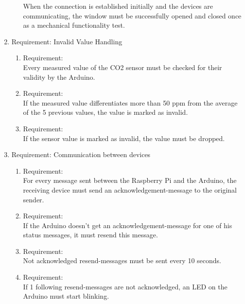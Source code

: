 \begin{enumerate}[label*=\arabic*.]
\begin{enumerate}[label*=\arabic*.]
            When the connection is established initially and the devices are communicating, the window must be successfully opened and closed once as a mechanical functionality test.\\
		\end{enumerate}
		\item \label{req.2}  Requirement:  Invalid Value Handling\\
  	\begin{enumerate}[label*=\arabic*.]
			\item \label{req.2.1}  Requirement:  \\
			Every measured value of the CO2 sensor must be checked for their validity by the Arduino.\\ 
   		\item \label{req.2.2}  Requirement:  \\
			If the measured value differentiates more than 50 ppm from the average of the 5 previous values, the value is marked as invalid.\\
   		\item \label{req.2.3}  Requirement:  \\
			If the sensor value is marked as invalid, the value must be dropped.\\
	  \end{enumerate}
		\item \label{req.3}  Requirement:   Communication between devices  \\
  	\begin{enumerate}[label*=\arabic*.]
			\item \label{req.3.1}  Requirement:  \\
			  For every message sent between the Raspberry Pi and the Arduino, the receiving device must send an acknowledgement-message to the original sender.\\
   		\item \label{req.3.2}  Requirement:  \\
			If the Arduino doesn't get an acknowledgement-message for one of his status messages, it must resend this message.\\
   		\item \label{req.3.3}  Requirement:  \\
			Not acknowledged resend-messages must be sent every 10 seconds.\\
   		\item \label{req.3.4}  Requirement:  \\
			If 1 following resend-messages are not acknowledged, an LED on the Arduino must start blinking.\\ 

\end{enumerate}
\end{enumerate}
